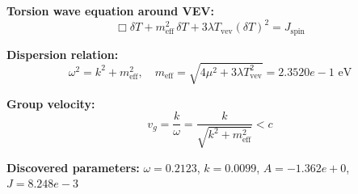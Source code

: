 
\textbf{Torsion wave equation around VEV:}
\begin{equation}
  \Box \delta T + m_{\text{eff}}^2 \, \delta T + 3\lambda T_{\text{vev}} (\delta T)^2 = J_{\text{spin}}
\end{equation}

\textbf{Dispersion relation:}
\begin{equation}
  \omega^2 = k^2 + m_{\text{eff}}^2, \quad
  m_{\text{eff}} = \sqrt{4\mu^2 + 3\lambda T_{\text{vev}}^2} = 2.3520e-1 \text{ eV}
\end{equation}

\textbf{Group velocity:}
\begin{equation}
  v_g = \frac{k}{\omega} = \frac{k}{\sqrt{k^2 + m_{\text{eff}}^2}} < c
\end{equation}

\textbf{Discovered parameters:}
$\omega = 0.2123$, \quad
$k = 0.0099$, \quad
$A = -1.362e+0$, \quad
$J = 8.248e-3$